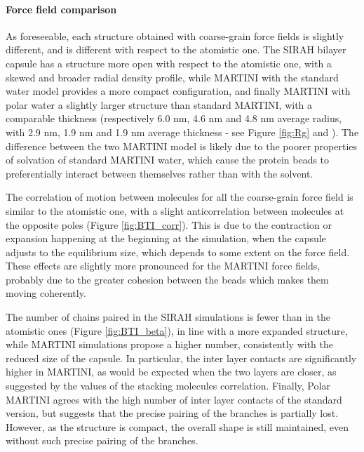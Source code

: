 \paragraph{Force field comparison}
As foreseeable, each structure obtained with coarse-grain force fields is slightly different, and is different with respect to the atomistic one.
%
The SIRAH bilayer capsule has a structure more open with respect to the atomistic one, with a skewed and broader radial density profile, while MARTINI with the standard water model provides a more compact configuration, and finally MARTINI with polar water a slightly larger structure than standard MARTINI, with a comparable thickness (respectively 6.0 nm, 4.6 nm and 4.8 nm average radius, with 2.9 nm, 1.9 nm and 1.9 nm average thickness - see Figure \ref{fig:Rg} and ).
%
The difference between the two MARTINI model is likely due to the poorer properties of solvation of standard MARTINI water, which cause the protein beads to preferentially interact between themselves rather than with the solvent. 

The correlation of motion between molecules for all the coarse-grain force field is similar to the atomistic one, with a slight anticorrelation between molecules at the opposite poles (Figure \ref{fig:BTI_corr}). This is due to the contraction or expansion happening at the beginning at the simulation, when the capsule adjusts to the equilibrium size, which depends to some extent on the force field.
%
These effects are slightly more pronounced for the MARTINI force fields, probably due to the greater cohesion between the beads which makes them moving coherently.

The number of chains paired in the SIRAH simulations is fewer than in the atomistic ones (Figure \ref{fig:BTI_beta}), in line with a more expanded structure, while MARTINI simulations propose a higher number, consistently with the reduced size of the capsule. In particular, the inter layer contacts are significantly higher in MARTINI, as would be expected when the two layers are closer, as suggested by the values of the stacking molecules correlation. Finally, Polar MARTINI agrees with the high number of inter layer contacts of the standard version, but suggests that the precise pairing of the branches is partially lost. However, as the structure is compact, the overall shape is still maintained, even without such precise pairing of the branches.

